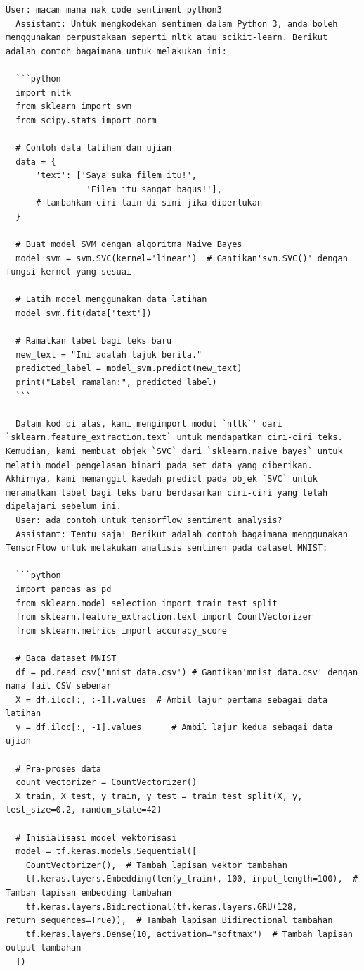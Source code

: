 \documentclass{article}
\begin{document}
\begin{lstlisting}[breaklines=true]
  User: macam mana nak code sentiment python3
  Assistant: Untuk mengkodekan sentimen dalam Python 3, anda boleh menggunakan perpustakaan seperti nltk atau scikit-learn. Berikut adalah contoh bagaimana untuk melakukan ini:

  ```python
  import nltk
  from sklearn import svm
  from scipy.stats import norm
  
  # Contoh data latihan dan ujian
  data = {
      'text': ['Saya suka filem itu!',
                'Filem itu sangat bagus!'],
      # tambahkan ciri lain di sini jika diperlukan
  }
  
  # Buat model SVM dengan algoritma Naive Bayes
  model_svm = svm.SVC(kernel='linear')  # Gantikan'svm.SVC()' dengan fungsi kernel yang sesuai
  
  # Latih model menggunakan data latihan
  model_svm.fit(data['text'])
  
  # Ramalkan label bagi teks baru
  new_text = "Ini adalah tajuk berita."
  predicted_label = model_svm.predict(new_text)
  print("Label ramalan:", predicted_label)
  ```

  Dalam kod di atas, kami mengimport modul `nltk`' dari `sklearn.feature_extraction.text` untuk mendapatkan ciri-ciri teks. Kemudian, kami membuat objek `SVC` dari `sklearn.naive_bayes` untuk melatih model pengelasan binari pada set data yang diberikan. Akhirnya, kami memanggil kaedah predict pada objek `SVC` untuk meramalkan label bagi teks baru berdasarkan ciri-ciri yang telah dipelajari sebelum ini.
  User: ada contoh untuk tensorflow sentiment analysis?
  Assistant: Tentu saja! Berikut adalah contoh bagaimana menggunakan TensorFlow untuk melakukan analisis sentimen pada dataset MNIST:

  ```python
  import pandas as pd
  from sklearn.model_selection import train_test_split
  from sklearn.feature_extraction.text import CountVectorizer
  from sklearn.metrics import accuracy_score
  
  # Baca dataset MNIST
  df = pd.read_csv('mnist_data.csv') # Gantikan'mnist_data.csv' dengan nama fail CSV sebenar
  X = df.iloc[:, :-1].values  # Ambil lajur pertama sebagai data latihan
  y = df.iloc[:, -1].values      # Ambil lajur kedua sebagai data ujian
  
  # Pra-proses data
  count_vectorizer = CountVectorizer()
  X_train, X_test, y_train, y_test = train_test_split(X, y, test_size=0.2, random_state=42)
  
  # Inisialisasi model vektorisasi
  model = tf.keras.models.Sequential([
    CountVectorizer(),  # Tambah lapisan vektor tambahan
    tf.keras.layers.Embedding(len(y_train), 100, input_length=100),  # Tambah lapisan embedding tambahan
    tf.keras.layers.Bidirectional(tf.keras.layers.GRU(128, return_sequences=True)),  # Tambah lapisan Bidirectional tambahan
    tf.keras.layers.Dense(10, activation="softmax")  # Tambah lapisan output tambahan
  ])
  

\end{lstlisting}
\end{document}
